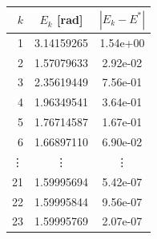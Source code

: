 \begin{tabular}{r c c}
\toprule
$k$ & $E_k$ [rad] & $|E_k-E^*|$\\
\midrule
1 & 3.14159265 & 1.54e+00\\
2 & 1.57079633 & 2.92e-02\\
3 & 2.35619449 & 7.56e-01\\
4 & 1.96349541 & 3.64e-01\\
5 & 1.76714587 & 1.67e-01\\
6 & 1.66897110 & 6.90e-02\\
\vdots & \vdots & \vdots\\
21 & 1.59995694 & 5.42e-07\\
22 & 1.59995844 & 9.56e-07\\
23 & 1.59995769 & 2.07e-07\\
\bottomrule
\end{tabular}
